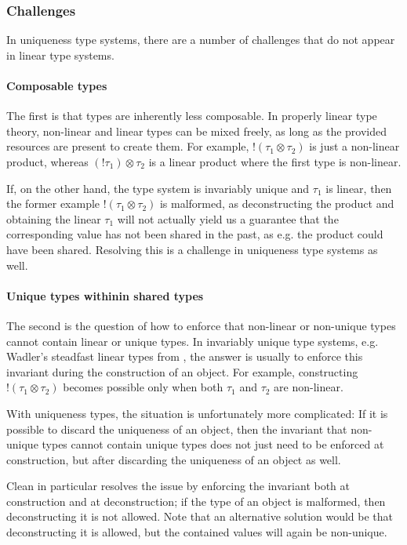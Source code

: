 \subsubsection{Challenges}
In uniqueness type systems, there are a number of challenges that do not appear in linear type systems. 

\paragraph{Composable types} The first is that types are inherently less composable. In properly linear type theory, non-linear and linear types can be mixed freely, as long as the provided resources are present to create them. For example, $!(\tau_1 \otimes \tau_2)$ is just a non-linear product, whereas $(!\tau_1) \otimes \tau_2$ is a linear product where the first type is non-linear. 

If, on the other hand, the type system is invariably unique and $\tau_1$ is linear, then the former example $!(\tau_1 \otimes \tau_2)$ is malformed, as deconstructing the product and obtaining the linear $\tau_1$ will not actually yield us a guarantee that the corresponding value has not been shared in the past, as e.g. the product could have been shared. Resolving this is a challenge in uniqueness type systems as well.

\paragraph{Unique types withinin shared types} The second is the question of how to enforce that non-linear or non-unique types cannot contain linear or unique types. In invariably unique type systems, e.g. Wadler's steadfast linear types from \cite{wadler_is_1991}, the answer is usually to enforce this invariant during the construction of an object. For example, constructing $!(\tau_1 \otimes \tau_2)$ becomes possible only when both $\tau_1$ and $\tau_2$ are non-linear.

With uniqueness types, the situation is unfortunately more complicated: If it is possible to discard the uniqueness of an object, then the invariant that non-unique types cannot contain unique types does not just need to be enforced at construction, but after discarding the uniqueness of an object as well. 

Clean in particular resolves the issue by enforcing the invariant both at construction and at deconstruction; if the type of an object is malformed, then deconstructing it is not allowed. Note that an alternative solution would be that deconstructing it is allowed, but the contained values will again be non-unique.

